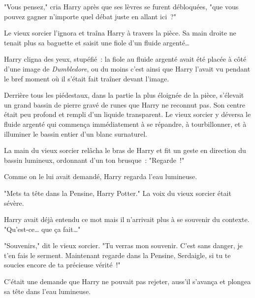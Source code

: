 "Vous pensez," cria Harry après que ses lèvres se furent débloquées, "que vous pouvez gagner n'importe quel débat juste en allant ici~?"

Le vieux sorcier l'ignora et traîna Harry à travers la pièce. Sa main droite ne tenait plus sa baguette et saisit une fiole d'un fluide argenté…

Harry cligna des yeux, stupéfié~: la fiole au fluide argenté avait été placée à côté d'une image de \emph{Dumbledore}, ou du moins c'est ainsi que Harry l'avait vu pendant le bref moment où il s'était fait traîner devant l'image.

Derrière tous les piédestaux, dans la partie la plus éloignée de la pièce, s'élevait un grand bassin de pierre gravé de runes que Harry ne reconnut pas. Son centre était peu profond et rempli d'un liquide transparent. Le vieux sorcier y déversa le fluide argenté qui commença immédiatement à se répandre, à tourbillonner, et à illuminer le bassin entier d'un blanc surnaturel.

La main du vieux sorcier relâcha le bras de Harry et fit un geste en direction du bassin lumineux, ordonnant d'un ton brusque~: "Regarde~!"

Comme on le lui avait demandé, Harry regarda l'eau lumineuse.

"Mets ta tête dans la Pensine, Harry Potter." La voix du vieux sorcier était sévère.

Harry avait déjà entendu ce mot mais il n'arrivait plus à se souvenir du contexte. "Qu'est-ce… que ça fait…"

"Souvenirs," dit le vieux sorcier. "Tu verras mon souvenir. C'est sans danger, je t'en fais le serment. Maintenant regarde dans la Pensine, Serdaigle, si tu te soucies encore de ta précieuse vérité~!"

C'était une demande que Harry ne pouvait pas rejeter, auss'il s'avança et plongea sa tête dans l'eau lumineuse.
\later

